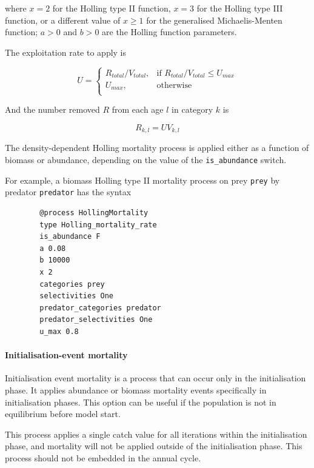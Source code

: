 where $x=2$ for the Holling type II function, $x=3$ for the Holling type III function, or a different value of $x \geq 1$ for the generalised Michaelis-Menten function; $a > 0$ and $b > 0$ are the Holling function parameters.

The exploitation rate to apply is

\begin{equation}
	U = \begin{cases}
		R_{total}/V_{total}, & \text{if $R_{total}/V_{total} \leq U_{max}$} \\
		U_{max}, & \text{otherwise}\\
	\end{cases}
\end{equation}

And the number removed $R$ from each age $l$ in category $k$ is

\begin{equation}
	R_{k,l} = U V_{k,l}
\end{equation}

The density-dependent Holling mortality process is applied either as a function of biomass or abundance, depending on the value of the \texttt{is\_abundance} switch.

For example, a biomass Holling type II mortality process on prey \texttt{prey} by predator \texttt{predator} has the syntax

{\small{\begin{verbatim}
		@process HollingMortality
		type Holling_mortality_rate
		is_abundance F
		a 0.08
		b 10000
		x 2
		categories prey
		selectivities One
		predator_categories predator
		predator_selectivities One
		u_max 0.8
		\end{verbatim}}}

\paragraph{Initialisation-event mortality}

Initialisation event mortality is a process that can occur only in the initialisation phase. It applies abundance or biomass mortality events specifically in initialisation phases. This option can be useful if the population is not in equilibrium before model start.

This process applies a single catch value for all iterations within the initialisation phase, and mortality will not be applied outside of the initialisation phase. This process should not be embedded in the annual cycle.

